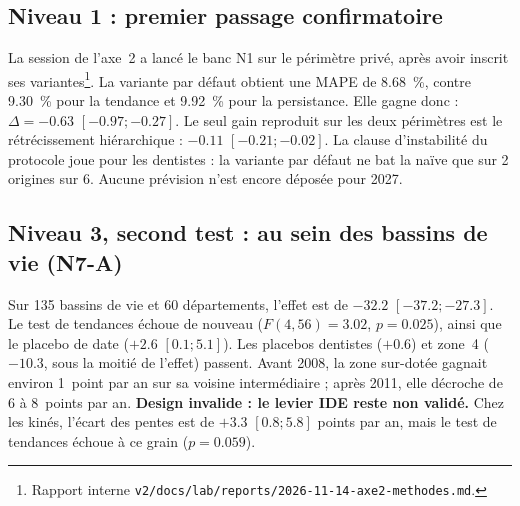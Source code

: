 \subsection{Niveau 1 : premier passage confirmatoire}
La session de l'axe~2 a lancé le banc N1 sur le périmètre privé, après avoir inscrit ses
variantes\footnote{Rapport interne \texttt{v2/docs/lab/reports/2026-11-14-axe2-methodes.md}.}. La
variante par défaut obtient une MAPE de \num{8.68}\mesure{}~\%, contre \num{9.30}\mesure{}~\% pour la
tendance et \num{9.92}\mesure{}~\% pour la persistance. Elle gagne donc :
$\Delta = \num{-0.63}$\mesure{} $[\num{-0.97} ; \num{-0.27}]$. Le seul gain reproduit sur les deux
périmètres est le rétrécissement hiérarchique : $-\num{0.11}$\mesure{} $[\num{-0.21} ;
\num{-0.02}]$. La clause d'instabilité du protocole joue pour les dentistes : la variante par défaut
ne bat la naïve que sur 2\mesure{} origines sur 6. Aucune prévision n'est encore déposée pour 2027.

\subsection{Niveau 3, second test : au sein des bassins de vie (N7-A)}
Sur 135\mesure{} bassins de vie et 60\mesure{} départements, l'effet est de
$\num{-32.2}$\mesure{} $[\num{-37.2} ; \num{-27.3}]$. Le test de tendances échoue de nouveau
($F(4, 56) = \num{3.02}$, $p = \num{0.025}$\mesure{}), ainsi que le placebo de date ($+\num{2.6}$\mesure{}
$[\num{0.1} ; \num{5.1}]$). Les placebos dentistes ($+\num{0.6}$\mesure{}) et zone~4
($\num{-10.3}$\mesure{}, sous la moitié de l'effet) passent. Avant 2008, la zone sur-dotée gagnait
environ 1\mesure{}~point par an sur sa voisine intermédiaire ; après 2011, elle décroche de 6 à
8\mesure{}~points par an. \textbf{Design invalide : le levier IDE reste non validé.} Chez les kinés,
l'écart des pentes est de $+\num{3.3}$\mesure{} $[\num{0.8} ; \num{5.8}]$ points par an, mais le test de
tendances échoue à ce grain ($p = \num{0.059}$\mesure{}).

